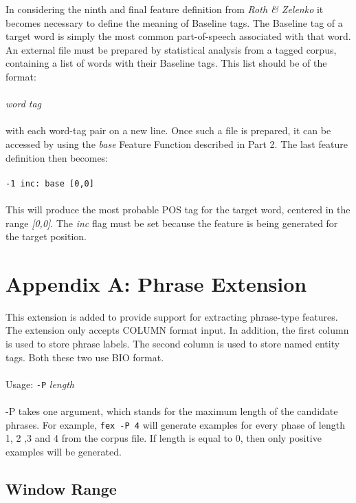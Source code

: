 \documentclass[11pt]{article}
\begin{document}
In considering the ninth and final feature definition from {\em Roth \& Zelenko}
it becomes necessary to define the meaning of Baseline tags.  The Baseline tag 
of a target word is simply the most common part-of-speech associated with that
word.  An external file must be prepared by statistical analysis from a tagged
corpus, containing a list of words with their Baseline tags.  This list should
be of the format:\\\\
{\em word  tag}\\\\
with each word-tag pair on a new line.  Once such a file is prepared, it can be
accessed by using the {\em base} Feature Function described in Part 2.  The last
feature definition then becomes:\\\\
{\tt -1 inc: base [0,0]}\\\\
This will produce the most probable POS tag for the target word, centered in 
the range {\em [0,0]}.  The {\em inc} flag must be set because the feature is 
being generated for the target position.

\section*{Appendix A: Phrase Extension}

This extension is added to provide support for extracting phrase-type features.
The extension only accepts COLUMN format input.  In addition, the first column 
is used to store phrase labels.  The second column is used to store named 
entity tags.  Both these two use BIO format. \\ \\
%
Usage: {\tt-P} {\em length} \\ \\
%
-P takes one argument, which stands for the maximum length of the candidate 
phrases.  For example, {\tt fex -P 4} will generate examples for every phase of 
length 1, 2 ,3 and 4 from the corpus file.  If length is equal to 0, then only 
positive examples will be generated.

\subsection*{Window Range}
\end{document}
